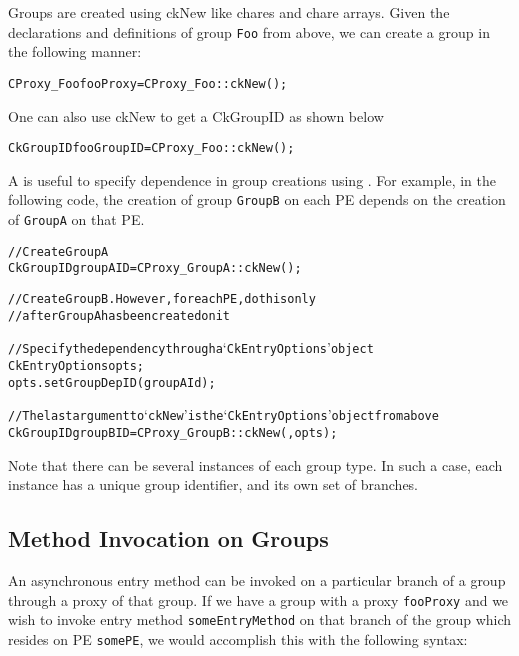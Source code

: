 Groups are created using {\kw ckNew} like chares and chare arrays. 
Given the declarations and definitions of group {\tt Foo}
from above, we can create a group in the following manner:

\begin{alltt}
CProxy_Foo fooProxy = CProxy_Foo::ckNew();
\end{alltt}

One can also use {\kw ckNew} to get a CkGroupID as shown below

\begin{alltt}
CkGroupID fooGroupID = CProxy_Foo::ckNew();
\end{alltt}

A  is useful to specify dependence in group creations using
. For example, in the following code, the creation of group
{\tt GroupB} on each PE depends on the creation of {\tt GroupA} on that PE.

\begin{alltt}
// Create GroupA
CkGroupID groupAID = CProxy_GroupA::ckNew();

// Create GroupB. However, for each PE, do this only 
// after GroupA has been created on it

// Specify the dependency through a `CkEntryOptions' object
CkEntryOptions opts;
opts.setGroupDepID(groupAId);

// The last argument to `ckNew' is the `CkEntryOptions' object from above
CkGroupID groupBID = CProxy_GroupB::ckNew(, opts);
\end{alltt}


Note that there can be several instances of each group type.
In such a case, each instance has a unique group identifier, and its own set
of branches.

\subsection{Method Invocation on Groups}

An asynchronous entry method can be invoked on a particular branch of a
group through a proxy of that group. If we have a group with a proxy
{\tt fooProxy} and we wish to invoke entry method {\tt someEntryMethod} on
that branch of the group which resides on PE {\tt somePE}, we would accomplish
this with the following syntax:

